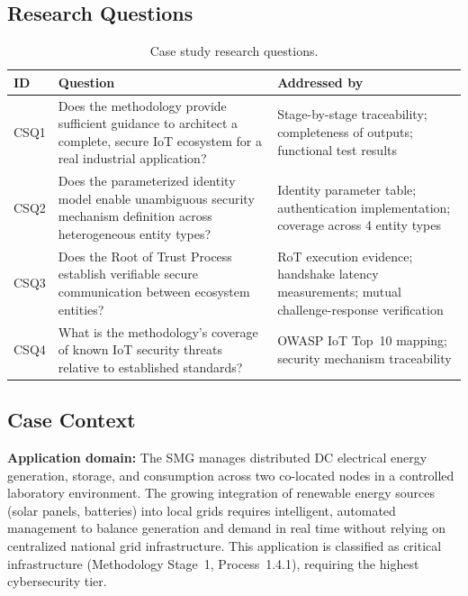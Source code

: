 \documentclass[preprint,12pt,authoryear]{elsarticle}
\begin{document}
\subsection{Research Questions}

\begin{table}[htbp]
    \centering
    \caption{Case study research questions.}
    \label{tab:csq}
    \small
    \renewcommand{\arraystretch}{1.15}
    \begin{tabular}{
        >{\centering\arraybackslash}p{0.9cm}
        >{\raggedright\arraybackslash}p{6.0cm}
        >{\raggedright\arraybackslash}p{5.0cm}
    }
        \toprule
        \textbf{ID} & \textbf{Question} & \textbf{Addressed by} \\
        \midrule
        CSQ1 & Does the methodology provide sufficient guidance to architect a complete, secure IoT ecosystem for a real industrial application? & Stage-by-stage traceability; completeness of outputs; functional test results \\
        CSQ2 & Does the parameterized identity model enable unambiguous security mechanism definition across heterogeneous entity types? & Identity parameter table; authentication implementation; coverage across 4 entity types \\
        CSQ3 & Does the Root of Trust Process establish verifiable secure communication between ecosystem entities? & RoT execution evidence; handshake latency measurements; mutual challenge-response verification \\
        CSQ4 & What is the methodology's coverage of known IoT security threats relative to established standards? & OWASP IoT Top~10 mapping; security mechanism traceability \\
        \bottomrule
    \end{tabular}
\end{table}

\subsection{Case Context}

\textbf{Application domain:} The SMG manages distributed DC electrical energy generation, storage, and consumption across two co-located nodes in a controlled laboratory environment. The growing integration of renewable energy sources (solar panels, batteries) into local grids requires intelligent, automated management to balance generation and demand in real time without relying on centralized national grid infrastructure. This application is classified as critical infrastructure (Methodology Stage~1, Process~1.4.1), requiring the highest cybersecurity tier.
\end{document}
